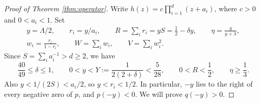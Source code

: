 \documentclass[11pt]{article}
\theoremstyle{remark}
\begin{document}
\begin{proof}[Proof of Theorem \ref{thm:operator}]
Write $h(z)=c\prod_{i=1}^d(z+a_i)$, where $c>0$ and $0<a_i<1$.
Set
\begin{gather*}
 y=\Lambda/2,\qquad r_i=y/a_i,\qquad
 R=\sum_i r_i=yS=\tfrac12-\delta y,\qquad
 \eta=\frac{y}{y+\lambda},\\
 w_i=\frac{r_i}{1-r_i},\qquad W=\sum_i w_i,\qquad V=\sum_i w_i^2.
\end{gather*}
Since $S=\sum_i a_i^{-1}>d\ge2$, we have
\begin{equation}\label{eq:bounds}
 \frac{40}{49}\le\delta\le1,\qquad
 0<y<Y:=\frac1{2(2+\delta)}<\frac5{28},\qquad
 0<R<\frac12,\qquad \eta\ge\frac13.
\end{equation}
Also $y<1/(2S)<a_i/2$, so $y<r_i<1/2$.
In particular, $-y$ lies to the right of every negative zero of $p$, and
$p(-y)<0$. We will prove $q(-y)>0$.


\end{proof}
\end{document}

